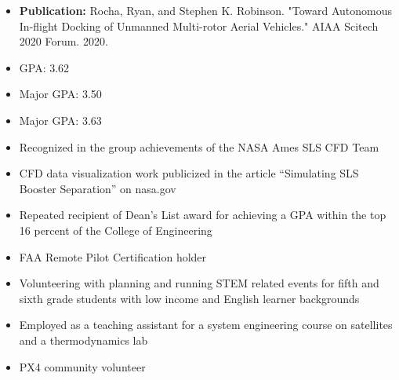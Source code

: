 
\begin{itemize}
  \item \textbf{Publication:} Rocha, Ryan, and Stephen K. Robinson. "Toward Autonomous In-flight Docking of Unmanned Multi-rotor Aerial Vehicles." AIAA Scitech 2020 Forum. 2020.
  \item GPA: 3.62
\end{itemize}
\divider

\begin{itemize}
  \item Major GPA: 3.50
\end{itemize}
\smallskip
{}
\begin{itemize}
  \item Major GPA: 3.63
\end{itemize}

\par\medskip
{}
\par\medskip
{}

\begin{itemize}
    \item Recognized in the group achievements of the NASA Ames SLS CFD Team
    \item CFD data visualization work publicized in the article “Simulating SLS Booster Separation” on nasa.gov
    \item Repeated recipient of Dean’s List award for achieving a GPA within the top 16 percent of the College of Engineering
\end{itemize}

\begin{itemize}
    \item FAA Remote Pilot Certification holder
    \item Volunteering with planning and running STEM related events for fifth and sixth grade students with low income and English learner backgrounds 
    \item Employed as a teaching assistant for a system engineering course on satellites and a thermodynamics lab
    \item PX4 community volunteer
\end{itemize}